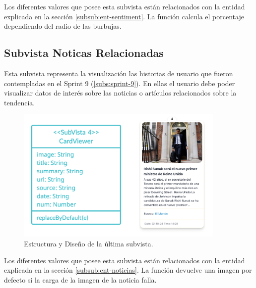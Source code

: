 Los diferentes valores que posee esta subvista están relacionados con la entidad explicada en la sección \ref{subsub:ent-sentiment}. La función calcula el porcentaje dependiendo del radio de las burbujas.

\subsection{Subvista Noticas Relacionadas}
Esta subvista representa la visualización las historias de usuario que fueron contempladas en el Sprint 9 (\ref{subs:sprint-9}). En ellas el usuario debe poder visualizar datos de interés sobre las noticias o artículos relacionados sobre la tendencia.

\begin{figure}[H]
    \centering
    \myfloatalign
    \includegraphics[width=0.9\textwidth]{gfx/subvista3.png}
    \caption[Estructura y Diseño de la última subvista]{Estructura y Diseño de la última subvista.}\label{gfx:subvista3}
\end{figure}

Los diferentes valores que posee esta subvista están relacionados con la entidad explicada en la sección \ref{subsub:ent-noticias}. La función devuelve una imagen por defecto si la carga de la imagen de la noticia falla.